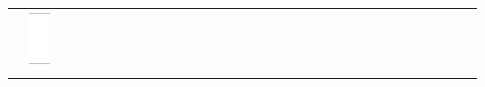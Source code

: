 \documentclass[10pt]{article}
\begin{document}
\begin{center}
\begin{tabular}{|c|c|c|c|c|c|c|c|c|c|c|c|c|c|c|c|c|c|c|c|c|c|c|c|c|c|c|c|c|c|c|c|}
 & \includegraphics[max width=\textwidth]{2024_11_21_2c2c97b7feae6d70b078g-09}

\end{tabular}
\end{center}
\end{document}
